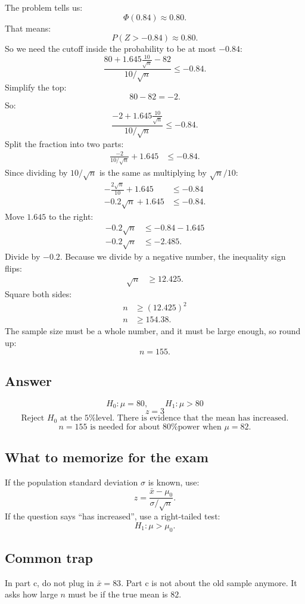 \documentclass[11pt,a4paper]{article}
\begin{document}
The problem tells us:
\[
\Phi(0.84)\approx 0.80.
\]
That means:
\[
P(Z>-0.84)\approx 0.80.
\]
So we need the cutoff inside the probability to be at most \(-0.84\):
\[
\frac{80+1.645\frac{10}{\sqrt{n}}-82}{10/\sqrt{n}}\le -0.84.
\]
Simplify the top:
\[
80-82=-2.
\]
So:
\[
\frac{-2+1.645\frac{10}{\sqrt{n}}}{10/\sqrt{n}}\le -0.84.
\]
Split the fraction into two parts:
\begin{align*}
\frac{-2}{10/\sqrt{n}}+1.645&\le -0.84.
\end{align*}
Since dividing by \(10/\sqrt{n}\) is the same as multiplying by \(\sqrt{n}/10\):
\begin{align*}
-\frac{2\sqrt{n}}{10}+1.645&\le -0.84\\
-0.2\sqrt{n}+1.645&\le -0.84.
\end{align*}
Move \(1.645\) to the right:
\begin{align*}
-0.2\sqrt{n}&\le -0.84-1.645\\
-0.2\sqrt{n}&\le -2.485.
\end{align*}
Divide by \(-0.2\). Because we divide by a negative number, the inequality sign flips:
\begin{align*}
\sqrt{n}&\ge 12.425.
\end{align*}
Square both sides:
\begin{align*}
n&\ge (12.425)^2\\
n&\ge 154.38.
\end{align*}
The sample size must be a whole number, and it must be large enough, so round up:
\[
n=155.
\]

\subsection*{Answer}
\[
\boxed{H_0:\mu=80,\qquad H_1:\mu>80}
\]
\[
\boxed{z=3}
\]
\[
\boxed{\text{Reject }H_0\text{ at the 5\% level. There is evidence that the mean has increased.}}
\]
\[
\boxed{n=155\text{ is needed for about 80\% power when }\mu=82.}
\]

\subsection*{What to memorize for the exam}
If the population standard deviation \(\sigma\) is known, use:
\[
z=\frac{\bar{x}-\mu_0}{\sigma/\sqrt{n}}.
\]
If the question says ``has increased'', use a right-tailed test:
\[
H_1:\mu>\mu_0.
\]

\subsection*{Common trap}
In part c, do not plug in \(\bar{x}=83\). Part c is not about the old sample anymore. It asks how large \(n\) must be if the true mean is \(82\).
\end{document}
